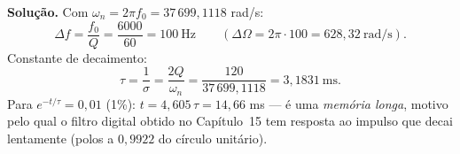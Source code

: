 
\textbf{Solução.} Com $\omega_n=2\pi f_0=37\,699{,}1118$ rad/s:
\[
  \Delta f=\frac{f_0}{Q}=\frac{6000}{60}=100\ \text{Hz}
  \qquad(\Delta\Omega=2\pi\cdot100=628{,}32\ \text{rad/s}).
\]
Constante de decaimento:
\[
  \tau=\frac{1}{\sigma}=\frac{2Q}{\omega_n}=\frac{120}{37\,699{,}1118}
  =3{,}1831\ \text{ms}.
\]
Para $e^{-t/\tau}=0{,}01$ (1\%): $t=4{,}605\,\tau=14{,}66$ ms — é uma
\emph{memória longa}, motivo pelo qual o filtro digital obtido no Capítulo~15
tem resposta ao impulso que decai lentamente (polos a $0{,}9922$ do círculo
unitário).

